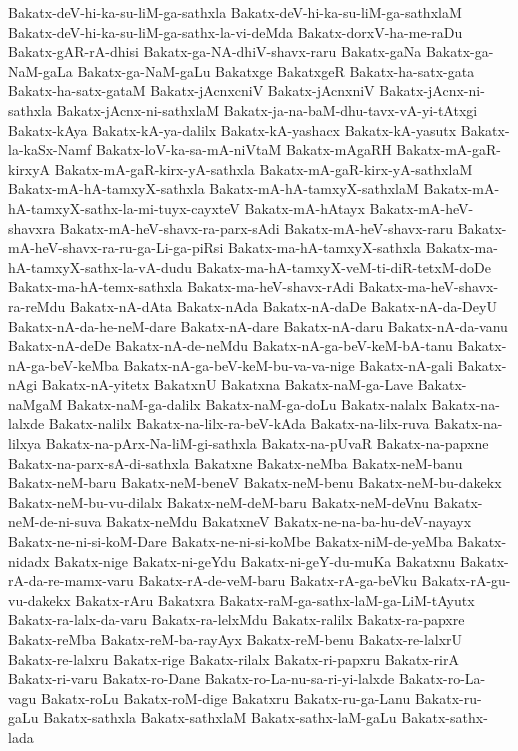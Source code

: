 {Bakatx-deV-hi-ka-su-liM-ga-sathxla
Bakatx-deV-hi-ka-su-liM-ga-sathxlaM
Bakatx-deV-hi-ka-su-liM-ga-sathx-la-vi-deMda
Bakatx-dorxV-ha-me-raDu
Bakatx-gAR-rA-dhisi
Bakatx-ga-NA-dhiV-shavx-raru
Bakatx-gaNa
Bakatx-ga-NaM-gaLa
Bakatx-ga-NaM-gaLu
Bakatxge
BakatxgeR
Bakatx-ha-satx-gata
Bakatx-ha-satx-gataM
Bakatx-jAcnxcniV
Bakatx-jAcnxniV
Bakatx-jAcnx-ni-sathxla
Bakatx-jAcnx-ni-sathxlaM
Bakatx-ja-na-baM-dhu-tavx-vA-yi-tAtxgi
Bakatx-kAya
Bakatx-kA-ya-dalilx
Bakatx-kA-yashacx
Bakatx-kA-yasutx
Bakatx-la-kaSx-Namf
Bakatx-loV-ka-sa-mA-niVtaM
Bakatx-mAgaRH
Bakatx-mA-gaR-kirxyA
Bakatx-mA-gaR-kirx-yA-sathxla
Bakatx-mA-gaR-kirx-yA-sathxlaM
Bakatx-mA-hA-tamxyX-sathxla
Bakatx-mA-hA-tamxyX-sathxlaM
Bakatx-mA-hA-tamxyX-sathx-la-mi-tuyx-cayxteV
Bakatx-mA-hAtayx
Bakatx-mA-heV-shavxra
Bakatx-mA-heV-shavx-ra-parx-sAdi
Bakatx-mA-heV-shavx-raru
Bakatx-mA-heV-shavx-ra-ru-ga-Li-ga-piRsi
Bakatx-ma-hA-tamxyX-sathxla
Bakatx-ma-hA-tamxyX-sathx-la-vA-dudu
Bakatx-ma-hA-tamxyX-veM-ti-diR-tetxM-doDe
Bakatx-ma-hA-temx-sathxla
Bakatx-ma-heV-shavx-rAdi
Bakatx-ma-heV-shavx-ra-reMdu
Bakatx-nA-dAta
Bakatx-nAda
Bakatx-nA-daDe
Bakatx-nA-da-DeyU
Bakatx-nA-da-he-neM-dare
Bakatx-nA-dare
Bakatx-nA-daru
Bakatx-nA-da-vanu
Bakatx-nA-deDe
Bakatx-nA-de-neMdu
Bakatx-nA-ga-beV-keM-bA-tanu
Bakatx-nA-ga-beV-keMba
Bakatx-nA-ga-beV-keM-bu-va-va-nige
Bakatx-nA-gali
Bakatx-nAgi
Bakatx-nA-yitetx
BakatxnU
Bakatxna
Bakatx-naM-ga-Lave
Bakatx-naMgaM
Bakatx-naM-ga-dalilx
Bakatx-naM-ga-doLu
Bakatx-nalalx
Bakatx-na-lalxde
Bakatx-nalilx
Bakatx-na-lilx-ra-beV-kAda
Bakatx-na-lilx-ruva
Bakatx-na-lilxya
Bakatx-na-pArx-Na-liM-gi-sathxla
Bakatx-na-pUvaR
Bakatx-na-papxne
Bakatx-na-parx-sA-di-sathxla
Bakatxne
Bakatx-neMba
Bakatx-neM-banu
Bakatx-neM-baru
Bakatx-neM-beneV
Bakatx-neM-benu
Bakatx-neM-bu-dakekx
Bakatx-neM-bu-vu-dilalx
Bakatx-neM-deM-baru
Bakatx-neM-deVnu
Bakatx-neM-de-ni-suva
Bakatx-neMdu
BakatxneV
Bakatx-ne-na-ba-hu-deV-nayayx
Bakatx-ne-ni-si-koM-Dare
Bakatx-ne-ni-si-koMbe
Bakatx-niM-de-yeMba
Bakatx-nidadx
Bakatx-nige
Bakatx-ni-geYdu
Bakatx-ni-geY-du-muKa
Bakatxnu
Bakatx-rA-da-re-mamx-varu
Bakatx-rA-de-veM-baru
Bakatx-rA-ga-beVku
Bakatx-rA-gu-vu-dakekx
Bakatx-rAru
Bakatxra
Bakatx-raM-ga-sathx-laM-ga-LiM-tAyutx
Bakatx-ra-lalx-da-varu
Bakatx-ra-lelxMdu
Bakatx-ralilx
Bakatx-ra-papxre
Bakatx-reMba
Bakatx-reM-ba-rayAyx
Bakatx-reM-benu
Bakatx-re-lalxrU
Bakatx-re-lalxru
Bakatx-rige
Bakatx-rilalx
Bakatx-ri-papxru
Bakatx-rirA
Bakatx-ri-varu
Bakatx-ro-Dane
Bakatx-ro-La-nu-sa-ri-yi-lalxde
Bakatx-ro-La-vagu
Bakatx-roLu
Bakatx-roM-dige
Bakatxru
Bakatx-ru-ga-Lanu
Bakatx-ru-gaLu
Bakatx-sathxla
Bakatx-sathxlaM
Bakatx-sathx-laM-gaLu
Bakatx-sathx-lada
}
